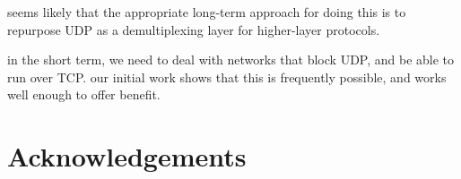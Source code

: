 \documentclass{sig-alternate-05-2015}
\begin{document}
seems likely that the appropriate long-term approach for doing this is to
repurpose UDP as a demultiplexing layer for higher-layer protocols. 

in the short term, we need to deal with networks that block UDP, and be
able to run over TCP.
our initial work shows that this is frequently possible, and works well
enough to offer benefit.

\section{Acknowledgements}




\end{document}
